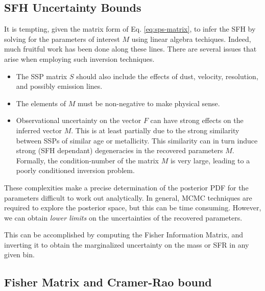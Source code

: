 \documentclass[iop,numberedappendix]{emulateapj}
\newcommand{\fim}{Fisher Information Matrix}
\begin{document}
\subsection{SFH Uncertainty Bounds}
It is tempting, given the matrix form of Eq. \ref{eq:sps-matrix}, to infer the SFH by solving for the parameters of interest $M$ using linear algebra techiques.
Indeed, much fruitful work has been done along these lines.
There are several issues that arise when employing such inversion techniques.
\begin{itemize}

\item The SSP matrix $S$ should also include the effects of dust, velocity, resolution, and possibly emission lines.

\item The elements of $M$ must be non-negative to make physical sense.

\item Observational uncertainty on the vector $F$ can have strong effects on the inferred vector $M$.  
This is at least partially due to the strong similarity between SSPs of similar age or metallicity.  
This similarity can in turn induce strong (SFH dependant) degeneracies in the recovered parameters $M$.
Formally, the condition-number of the matrix $M$ is very large, leading to a poorly conditioned inversion problem.
\end{itemize}
These complexities make a precise determination of the posterior PDF for the parameters difficult to work out analytically.
In general, MCMC techniques are required to explore the posterior space, but this can be time consuming.
However, we can obtain \emph{lower limits} on the uncertainties of the recovered parameters.

This can be accomplished by computing the \fim, and inverting it to obtain the marginalized uncertainty on the mass or SFR in any given bin.

\subsection{Fisher Matrix and Cramer-Rao bound}
\end{document}
